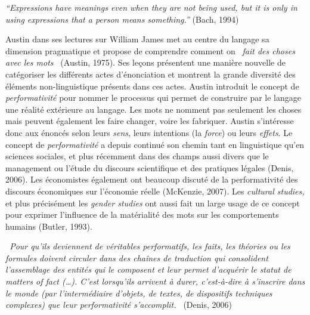 {\textit{{\textquotedblleft}Expressions have meanings even when they are
not being used, but it is only in using expressions that a person means
something.{\textquotedblright} }(Bach, 1994)

Austin dans ses lectures sur William James met au centre du langage sa
dimension pragmatique et propose de comprendre comment on
\textit{{\guillemotleft}~fait des choses avec les
mots~{\guillemotright}} (Austin, 1975). Ses le\c{c}ons pr\'esentent une
mani\`ere nouvelle de cat\'egoriser les diff\'erents actes
d{\textquoteright}\'enonciation et montrent la grande diversit\'e des
\'el\'ements non-linguistique pr\'esents dans ces actes. Austin
introduit le concept de \textit{performativit\'e }pour nommer le
processus qui permet de construire par le langage une r\'ealit\'e
ext\'erieure au langage. Les mots ne nomment pas seulement les choses
mais peuvent \'egalement les faire changer, voire les fabriquer. Austin
s{\textquoteright}int\'eresse donc aux \'enonc\'es selon leurs
\textit{sens}, leurs intentions (la \textit{force}) ou leurs
\textit{effets}. Le concept de \textit{performativit\'e }a depuis
continu\'e son chemin tant en linguistique qu{\textquoteright}en
sciences sociales, et plus r\'ecemment dans des champs aussi divers que
le management ou l{\textquoteright}\'etude du discours scientifique et
des pratiques l\'egales (Denis, 2006). Les \'economistes \'egalement
ont beaucoup discut\'e de la performativit\'e des discours
\'economiques sur l{\textquoteright}\'economie r\'eelle (McKenzie,
2007). Les \textit{cultural studies,} et plus pr\'ecis\'ement les
\textit{gender studies }ont aussi fait un large usage de ce concept
pour exprimer l{\textquoteright}influence de la mat\'erialit\'e des
mots sur les comportements humains (Butler, 1993). 

\textit{{\guillemotleft}~Pour qu{\textquoteright}ils deviennent de
{\guillemotleft} v\'eritables {\guillemotright} performatifs, les
faits, les th\'eories ou les formules doivent circuler dans des
cha\^ines de traduction qui consolident l{\textquoteright}assemblage
des entit\'es qui le composent et leur permet
d{\textquoteright}acqu\'erir le statut de {\guillemotleft} matters of
fact {\guillemotright} ({\dots}). C{\textquoteright}est
lorsqu{\textquoteright}ils arrivent \`a durer,
c{\textquoteright}est-\`a-dire \`a s{\textquoteright}inscrire dans le
monde (par l{\textquoteright}interm\'ediaire d{\textquoteright}objets,
de textes, de dispositifs techniques complexes) que leur
performativit\'e s{\textquoteright}accomplit.~{\guillemotright}
}(Denis, 2006)

}
